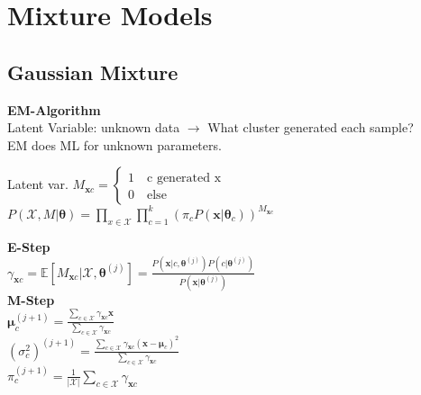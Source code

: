 \section*{Mixture Models}

\subsection*{Gaussian Mixture}
\textbf{EM-Algorithm}\\
Latent Variable: unknown data $\rightarrow$ What cluster generated each sample?\\
EM does ML for unknown parameters.

Latent var. $M_{\mathbf{x}c}{=}\begin{cases} 
       1 \quad \text{c generated x}\\
       0 \quad \text{else}
       \end{cases} 
$\\
$P(\mathcal{X}, M|\mathbf{\theta}){=}\prod_{x\in\mathcal{X}}\prod_{c=1}^k(\pi_cP(\mathbf{x}|\mathbf{\theta}_c))^{M_{\mathbf{x}c}}$

\textbf{E-Step}\\
$ \gamma_{\mathbf{x}c}{=}\mathbb{E}[M_{\mathbf{x}c}|\mathcal{X},\mathbf{\theta}^{(j)}]{=}\frac{P(\mathbf{x}|c,\mathbf{\theta}^{(j)})P(c|\mathbf{\theta}^{(j)})}{P(\mathbf{x}|\mathbf{\theta}^{(j)})}$\\
\textbf{M-Step}\\
$\mathbf{\mu}_c^{(j+1)}=\frac{\sum_{c\in\mathcal{X}}\gamma_{\mathbf{x}c}\mathbf{x}}{\sum_{c\in\mathcal{X}}\gamma_{\mathbf{x}c}}$\\
$(\sigma_c^2)^{(j+1)}=\frac{\sum_{c\in\mathcal{X}}\gamma_{\mathbf{x}c}(\mathbf{x}-\mathbf{\mu}_c)^2}{\sum_{c\in\mathcal{X}}\gamma_{\mathbf{x}c}}$\\
$\pi_c^{(j+1)}=\frac{1}{|\mathcal{X}|}\sum_{c\in\mathcal{X}}\gamma_{\mathbf{x}c}$\\

